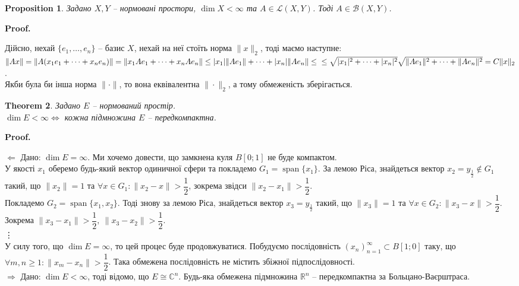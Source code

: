 \documentclass[a4paper, 10pt]{article}
\makeatletter
\def\rightproof{$\boxed{\Rightarrow}$ }
\def\leftproof{$\boxed{\Leftarrow}$ }
\theoremstyle{theoremdd}
\newtheorem{theorem}{Theorem}[subsection]
\newtheorem{proposition}[theorem]{Proposition}
\DeclareMathOperator{\linspan}{span}
\renewenvironment{proof}[1][Proof.\\]{\par
\pushQED{\hfill \qed}%
\normalfont \topsep6\p@\@plus6\p@\relax
\trivlist
\item\relax
{\bfseries
#1\@addpunct{.}}\hspace\labelsep\ignorespaces
}{%
\popQED\endtrivlist\@endpefalse
}
\makeatother
\begin{document}
\begin{proposition}
Задано $X,Y$ -- нормовані простори, $\dim X < \infty$ та $A \in \mathcal{L}(X,Y)$. Тоді $A \in \mathcal{B}(X,Y)$.
\end{proposition}

\begin{proof}
Дійсно, нехай $\{e_1,\dots,e_n\}$ -- базис $X$, нехай на неї стоїть норма $\|x\|_2$, тоді маємо наступне:\\
$\|Ax\| = \|A (x_1 e_1 + \dots + x_n e_n) \| = \| x_1 A e_1 + \dots + x_n A e_n \| \leq |x_1| \|A e_1 \| + \dots + |x_n| \|A e_n \| \leq \\
\leq \sqrt{|x_1|^2 + \dots + |x_n|^2} \sqrt{\|Ae_1\|^2 + \dots + \|Ae_n\|^2} = C \|x\|_2$.\\
Якби була би інша норма $\| \cdot \|$, то вона еквівалентна $\| \cdot \|_2$, а тому обмеженість зберігається.
\end{proof}

\begin{theorem}
Задано $E$ -- нормований простір.\\
$\dim E < \infty \iff$ кожна підмножина $E$ -- передкомпактна.
\end{theorem}

\begin{proof}
\leftproof Дано: $\dim E = \infty$. Ми хочемо довести, що замкнена куля $B[0;1]$ не буде компактом.\\
У якості $x_1$ оберемо будь-який вектор одиничної сфери та покладемо $G_1 = \linspan\{x_1\}$. За лемою Ріса, знайдеться вектор $x_2 = y_{\frac{1}{2}} \notin G_1$ такий, що $\|x_2\| = 1$ та $\forall x \in G_1: \|x_2-x\| > \dfrac{1}{2}$, зокрема звідси $\|x_2 - x_1\| > \dfrac{1}{2}$.\\
Покладемо $G_2 = \linspan\{x_1,x_2\}$. Тоді знову за лемою Ріса, знайдеться вектор $x_3 = y_{\frac{1}{2}}$ такий, що $\|x_3\| = 1$ та $\forall x \in G_2: \|x_3-x\| > \dfrac{1}{2}$. Зокрема $\|x_3 - x_1\| > \dfrac{1}{2},\ \|x_3 - x_2\| > \dfrac{1}{2}$.\\
\vdots \\
У силу того, що $\dim E = \infty$, то цей процес буде продовжуватися. Побудуємо послідовність $(x_n)_{n=1}^\infty \subset B[1;0]$ таку, що $\forall m,n \geq 1: \| x_m - x_n \| > \dfrac{1}{2}$. Така обмежена послідовність не містить збіжної підпослідовності.
\bigskip \\
\rightproof Дано: $\dim E < \infty$, тоді відомо, що $E \cong \mathbb{C}^n$. Будь-яка обмежена підмножина $\mathbb{R}^n$ -- передкомпактна за Больцано-Ваєрштраса.
\end{proof}
\end{document}
